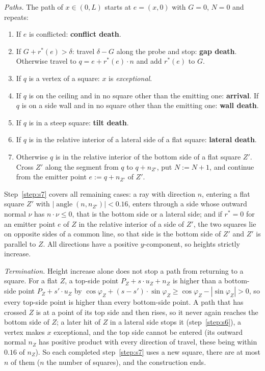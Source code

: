 \documentclass[11pt,letterpaper]{amsart}
\theoremstyle{plain}
\theoremstyle{definition}
\theoremstyle{remark}
\begin{document}
\emph{Paths.} The path of $x\in(0,L)$ starts at $e=(x,0)$ with $G=0$, $N=0$ and repeats:
\begin{enumerate}
\item\label{step:s1} If $e$ is conflicted: \textbf{conflict death}.
\item\label{step:s2} If $G+r^*(e)>\delta$: travel $\delta-G$ along the probe and stop: \textbf{gap death}. Otherwise travel to $q=e+r^*(e)\cdot n$ and add $r^*(e)$ to $G$.
\item If $q$ is a vertex of a square: $x$ is \emph{exceptional}.
\item If $q$ is on the ceiling and in no square other than the emitting one: \textbf{arrival}. If $q$ is on a side wall and in no square other than the emitting one: \textbf{wall death}.
\item If $q$ is in a steep square: \textbf{tilt death}.
\item\label{step:s6} If $q$ is in the relative interior of a lateral side of a flat square: \textbf{lateral death}.
\item\label{step:s7} Otherwise $q$ is in the relative interior of the bottom side of a flat square $Z'$. Cross $Z'$ along the segment from $q$ to $q+n_{Z'}$, put $N:=N+1$, and continue from the emitter point $e:=q+n_{Z'}$ of $Z'$.
\end{enumerate}
Step~\ref{step:s7} covers all remaining cases: a ray with direction $n$, entering a flat square $Z'$ with $|\operatorname{angle}(n,n_{Z'})|<0.16$, enters through a side whose outward normal $\nu$ has $n\cdot\nu\le0$, that is the bottom side or a lateral side; and if $r^*=0$ for an emitter point $e$ of $Z$ in the relative interior of a side of $Z'$, the two squares lie on opposite sides of a common line, so that side is the bottom side of $Z'$ and $Z'$ is parallel to $Z$. All directions have a positive $y$-component, so heights strictly increase.

\emph{Termination.} Height increase alone does not stop a path from returning to a square. For a flat $Z$, a top-side point $P_Z+s\cdot u_Z+n_Z$ is higher than a bottom-side point $P_Z+s'\cdot u_Z$ by $\cos\varphi_Z+(s-s')\cdot\sin\varphi_Z\ge\cos\varphi_Z-|\sin\varphi_Z|>0$, so every top-side point is higher than every bottom-side point. A path that has crossed $Z$ is at a point of its top side and then rises, so it never again reaches the bottom side of $Z$; a later hit of $Z$ in a lateral side stops it (step~\ref{step:s6}), a vertex makes $x$ exceptional, and the top side cannot be entered (its outward normal $n_Z$ has positive product with every direction of travel, these being within $0.16$ of $n_Z$). So each completed step~\ref{step:s7} uses a new square, there are at most $n$ of them ($n$ the number of squares), and the construction ends.
\end{document}
